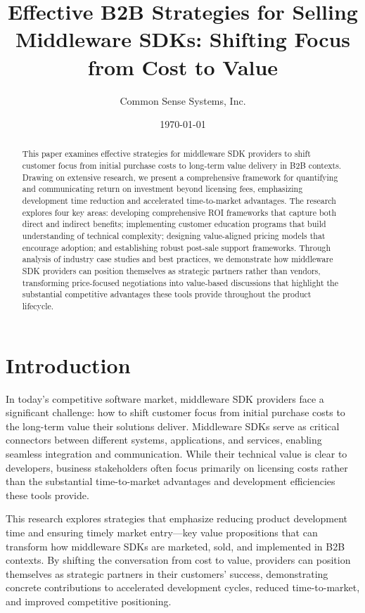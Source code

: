 \documentclass[11pt,a4paper]{article}
\title{\LARGE\textbf{Effective B2B Strategies for Selling Middleware SDKs: Shifting Focus from Cost to Value}}
\author{Common Sense Systems, Inc.}
\date{\today}
\begin{document}
\maketitle
\thispagestyle{fancy}

\begin{abstract}
This paper examines effective strategies for middleware SDK providers to shift customer focus from initial purchase costs to long-term value delivery in B2B contexts. Drawing on extensive research, we present a comprehensive framework for quantifying and communicating return on investment beyond licensing fees, emphasizing development time reduction and accelerated time-to-market advantages. The research explores four key areas: developing comprehensive ROI frameworks that capture both direct and indirect benefits; implementing customer education programs that build understanding of technical complexity; designing value-aligned pricing models that encourage adoption; and establishing robust post-sale support frameworks. Through analysis of industry case studies and best practices, we demonstrate how middleware SDK providers can position themselves as strategic partners rather than vendors, transforming price-focused negotiations into value-based discussions that highlight the substantial competitive advantages these tools provide throughout the product lifecycle.
\end{abstract}

\tableofcontents
\newpage

\section{Introduction}

In today's competitive software market, middleware SDK providers face a significant challenge: how to shift customer focus from initial purchase costs to the long-term value their solutions deliver. Middleware SDKs serve as critical connectors between different systems, applications, and services, enabling seamless integration and communication. While their technical value is clear to developers, business stakeholders often focus primarily on licensing costs rather than the substantial time-to-market advantages and development efficiencies these tools provide.

This research explores strategies that emphasize reducing product development time and ensuring timely market entry—key value propositions that can transform how middleware SDKs are marketed, sold, and implemented in B2B contexts. By shifting the conversation from cost to value, providers can position themselves as strategic partners in their customers' success, demonstrating concrete contributions to accelerated development cycles, reduced time-to-market, and improved competitive positioning.
\end{document}
